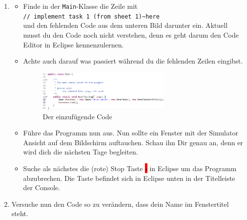 \begin{enumerate}
	\item\label{ex1b}
	\begin{itemize}
		\item Finde in der \lstinline{Main}-Klasse die Zeile mit\\
		\hspace*{\fill}\lstinline{// implement task 1 (from sheet 1)~here}\hspace*{\fill}\\
		und den fehlenden Code aus dem unteren Bild darunter ein.
  		Aktuell musst du den Code noch nicht verstehen, denn es geht darum den Code Editor in Eclipse kennenzulernen.
		\item Achte auch darauf was passiert während du die fehlenden Zeilen eingibst.
		\begin{figure} [H]
			\centering
			\label{code}
			\includegraphics [width=0.66\textwidth]{./figures/code.1.png}
			\caption{Der einzufügende Code}
		\end{figure}
    	\item Führe das Programm nun aus. Nun sollte ein Fenster mit der Simulator Ansicht auf dem Bildschirm auftauchen. Schau ihn Dir genau an, denn er wird dich die nächsten Tage begleiten.
    	\item Suche als nächstes die (rote) Stop Taste \colorbox{red}{$\square$} in Eclipse um das Programm abzubrechen. Die Taste befindet sich in Eclipse unten in der Titelleiste der Console.
	\end{itemize}

    \item Versuche nun den Code so zu verändern, dass dein Name im Fenstertitel steht.
\end{enumerate}


